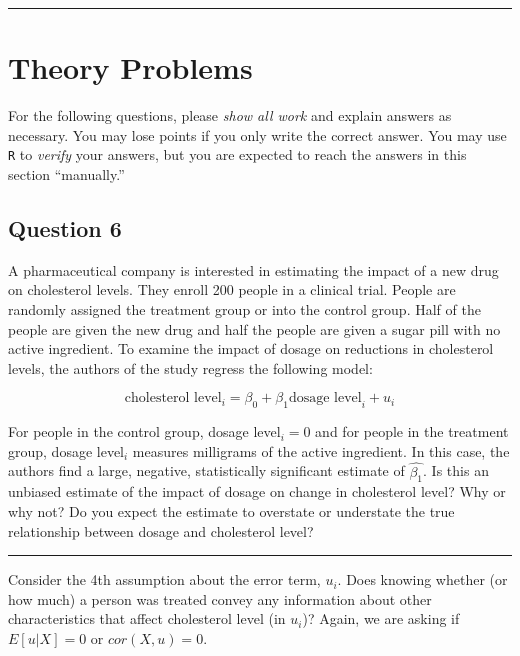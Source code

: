 \documentclass[
]{article}
\begin{document}
\begin{center}\rule{0.5\linewidth}{0.5pt}\end{center}

\hypertarget{theory-problems}{%
\section{Theory Problems}\label{theory-problems}}

For the following questions, please \emph{show all work} and explain
answers as necessary. You may lose points if you only write the correct
answer. You may use \texttt{R} to \emph{verify} your answers, but you
are expected to reach the answers in this section ``manually.''

\hypertarget{question-6}{%
\subsection{Question 6}\label{question-6}}

A pharmaceutical company is interested in estimating the impact of a new
drug on cholesterol levels. They enroll 200 people in a clinical trial.
People are randomly assigned the treatment group or into the control
group. Half of the people are given the new drug and half the people are
given a sugar pill with no active ingredient. To examine the impact of
dosage on reductions in cholesterol levels, the authors of the study
regress the following model:

\[\text{cholesterol level}_i = \beta_0+\beta_1 \text{dosage level}_i + u_i\]

For people in the control group, dosage level\(_i=0\) and for people in
the treatment group, dosage level\(_i\) measures milligrams of the
active ingredient. In this case, the authors find a large, negative,
statistically significant estimate of \(\hat{\beta_1}\). Is this an
unbiased estimate of the impact of dosage on change in cholesterol
level? Why or why not? Do you expect the estimate to overstate or
understate the true relationship between dosage and cholesterol level?

\begin{center}\rule{0.5\linewidth}{0.5pt}\end{center}

Consider the 4th assumption about the error term, \(u_i\). Does knowing
whether (or how much) a person was treated convey any information about
other characteristics that affect cholesterol level (in \(u_i\))? Again,
we are asking if \(E[u|X]=0\) or \(cor(X, u)=0\).
\end{document}
